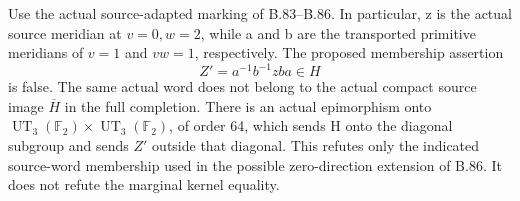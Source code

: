 Use the actual source-adapted marking of B.83--B.86. In particular, z is
the actual source meridian at \(v=0,w=2\), while a and b are the
transported primitive meridians of \(v=1\) and \(vw=1\), respectively.
The proposed membership assertion
\[
                  Z'=a^{-1}b^{-1}zba\in H
\tag{B.88.1}
\]
is false. The same actual word does not belong to the actual compact
source image \(\overline H\) in the full completion.
There is an actual epimorphism onto
\(\operatorname{UT}_3(\mathbb F_2)\times
  \operatorname{UT}_3(\mathbb F_2)\), of order 64, which sends H onto
the diagonal subgroup and sends \(Z'\) outside that diagonal.
This refutes only the indicated source-word membership used in the
possible zero-direction extension of B.86. It does not refute the
marginal kernel equality.

